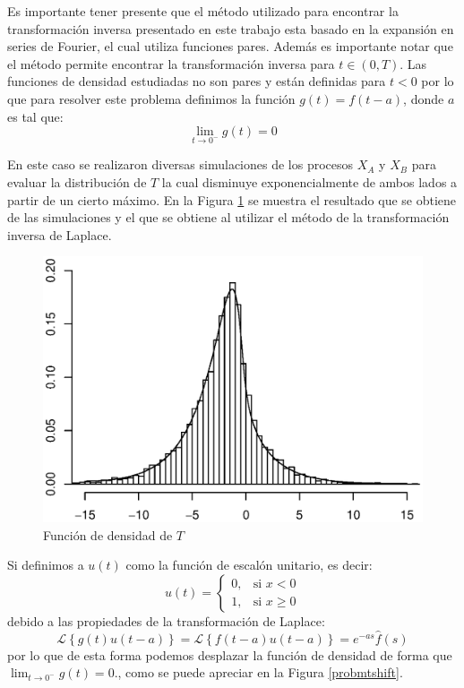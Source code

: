 \documentclass[11pt]{article}
\numberwithin{equation}{section} %
\begin{document}
Es importante tener presente que el método utilizado para encontrar la transformación inversa presentado en este trabajo esta basado en la expansión en series de Fourier, el cual utiliza funciones pares. Además es importante notar que el método permite encontrar la transformación inversa para $t \in (0,T)$. Las funciones de densidad estudiadas no son pares y están definidas para $t<0$ por lo que para resolver este problema definimos la función $g(t)=
f(t-a)$, donde $a$ es tal que:
\[
\lim_{t\to 0^-} g(t)=0
\]

En este caso se realizaron diversas simulaciones de los procesos $X_A$ y $X_B$ para evaluar la distribución de $T$ la cual disminuye exponencialmente de ambos lados a partir de un cierto máximo. En la Figura \ref{probmt} se muestra el resultado que se obtiene de las simulaciones y el que se obtiene al utilizar el método de la transformación inversa de Laplace.\\

\begin{figure}[htbp] \centering
\includegraphics[scale=0.75,trim=0 1cm 0 1cm]{probpm.eps}
\caption{Función de densidad de $T$}
\label{probmt}
\end{figure}

Si definimos a $u(t)$ como la función de escalón unitario, es decir:
\[
u(t) =
\begin{cases}
0, & \mbox{si } x<0 \\
1, & \mbox{si } x\geq0
\end{cases}
\]
debido a las propiedades de la transformación de Laplace:
\[
\mathcal{L} \left\{g(t)u(t-a)\right\}=\mathcal{L} \left\{f(t-a)u(t-a)\right\}=e^{-as}\hat{f}(s)
\]
por lo que de esta forma podemos desplazar la función de densidad de forma que $\lim_{t\to 0^-} g(t)=0$., como se puede apreciar en la Figura \ref{probmtshift}.\\
\end{document}
